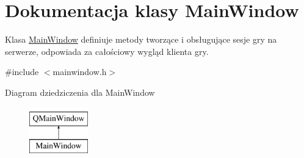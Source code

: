 \hypertarget{classMainWindow}{}\section{Dokumentacja klasy Main\+Window}
\label{classMainWindow}


Klasa \mbox{\hyperlink{classMainWindow}{Main\+Window}} definiuje metody tworzące i obsługujące sesje gry na serwerze, odpowiada za całościowy wygląd klienta gry.  




{\ttfamily \#include $<$mainwindow.\+h$>$}

Diagram dziedziczenia dla Main\+Window\begin{figure}[H]
\begin{center}
\leavevmode
\includegraphics[height=2.000000cm]{classMainWindow}
\end{center}
\end{figure}
